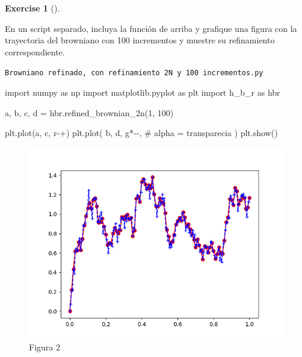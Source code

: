 \documentclass[
  letterpaper,
  DIV=11,
  numbers=noendperiod]{scrreprt}
\newenvironment{Shaded}{\begin{snugshade}}{\end{snugshade}}
\newcommand{\CommentTok}[1]{\textcolor[rgb]{0.37,0.37,0.37}{#1}}
\newcommand{\DecValTok}[1]{\textcolor[rgb]{0.68,0.00,0.00}{#1}}
\newcommand{\ImportTok}[1]{\textcolor[rgb]{0.00,0.46,0.62}{#1}}
\newcommand{\NormalTok}[1]{\textcolor[rgb]{0.00,0.23,0.31}{#1}}
\newcommand{\OperatorTok}[1]{\textcolor[rgb]{0.37,0.37,0.37}{#1}}
\newcommand{\StringTok}[1]{\textcolor[rgb]{0.13,0.47,0.30}{#1}}
\theoremstyle{plain}
\theoremstyle{definition}
\newtheorem{exercise}{Exercise}[chapter]
\theoremstyle{remark}
\begin{document}
\begin{exercise}[]\protect\hypertarget{exr-4}{}\label{exr-4}

En un script separado, incluya la función de arriba y grafique una
figura con la trayectoria del browniano con 100 incrementos y muestre su
refinamiento correspondiente.

\end{exercise}

\begin{codelisting}

\caption{\texttt{Browniano refinado, con refinamiento 2N y 100 incrementos.py}}

\begin{Shaded}
\begin{Highlighting}[]
\ImportTok{import}\NormalTok{ numpy }\ImportTok{as}\NormalTok{ np}
\ImportTok{import}\NormalTok{ matplotlib.pyplot }\ImportTok{as}\NormalTok{ plt}
\ImportTok{import}\NormalTok{ h\_b\_r }\ImportTok{as}\NormalTok{ hbr}

\NormalTok{a, b, c, d }\OperatorTok{=}\NormalTok{ hbr.refined\_brownian\_2n(}\DecValTok{1}\NormalTok{, }\DecValTok{100}\NormalTok{)}

\NormalTok{plt.plot(a, c, }\StringTok{\textquotesingle{}r{-}+\textquotesingle{}}\NormalTok{)}
\NormalTok{plt.plot(}
\NormalTok{    b,}
\NormalTok{    d,}
    \StringTok{\textquotesingle{}g*{-}{-}\textquotesingle{}}\NormalTok{,}
    \CommentTok{\# alpha = transparecia}
\NormalTok{    )}
\NormalTok{plt.show()}
\end{Highlighting}
\end{Shaded}

\end{codelisting}

\begin{figure}

{\centering \includegraphics{Figure_2_T4.png}

}

\caption{Figura 2}

\end{figure}
\end{document}

